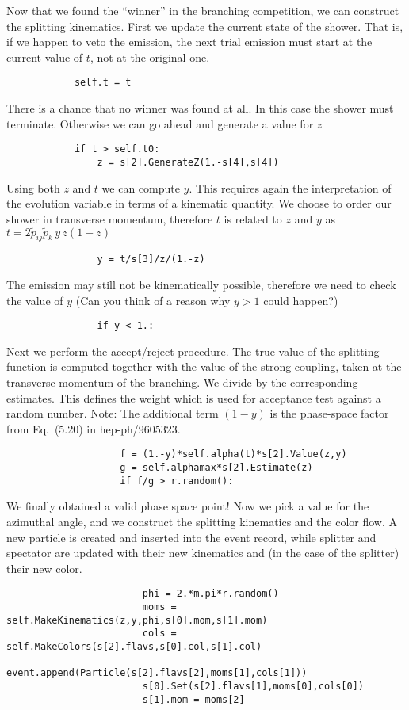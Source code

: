 \documentclass[10pt,fleqn]{scrartcl}
\begin{document}
Now that we found the ``winner'' in the branching competition, we can construct
the splitting kinematics. First we update the current state of the shower. That is,
if we happen to veto the emission, the next trial emission must start at the current
value of $t$, not at the original one.
\begin{verbatim}
            self.t = t
\end{verbatim}
There is a chance that no winner was found at all. In this case the shower must 
terminate. Otherwise we can go ahead and generate a value for $z$
\begin{verbatim}
            if t > self.t0:
                z = s[2].GenerateZ(1.-s[4],s[4])
\end{verbatim}
Using both $z$ and $t$ we can compute $y$. This requires again the interpretation of 
the evolution variable in terms of a kinematic quantity. We choose to order our shower
in transverse momentum, therefore $t$ is related to $z$ and $y$ as 
$t=2\tilde{p}_{ij}\tilde{p}_k\,y\,z(1-z)$
\begin{verbatim}
                y = t/s[3]/z/(1.-z)
\end{verbatim}
The emission may still not be kinematically possible, therefore we need to check 
the value of $y$ (Can you think of a reason why $y>1$ could happen?)
\begin{verbatim}
                if y < 1.:
\end{verbatim}
Next we perform the accept/reject procedure. The true value of the splitting function
is computed together with the value of the strong coupling, taken at the transverse 
momentum of the branching. We divide by the corresponding estimates. This defines
the weight which is used for acceptance test against a random number. Note: 
The additional term $(1-y)$ is the phase-space factor from Eq.~(5.20) in hep-ph/9605323.
\begin{verbatim}
                    f = (1.-y)*self.alpha(t)*s[2].Value(z,y)
                    g = self.alphamax*s[2].Estimate(z)
                    if f/g > r.random():
\end{verbatim}
We finally obtained a valid phase space point! Now we pick a value for the azimuthal angle,
and we construct the splitting kinematics and the color flow. A new particle is created and 
inserted into the event record, while splitter and spectator are updated with their 
new kinematics and (in the case of the splitter) their new color.
\begin{verbatim}
                        phi = 2.*m.pi*r.random()
                        moms = self.MakeKinematics(z,y,phi,s[0].mom,s[1].mom)
                        cols = self.MakeColors(s[2].flavs,s[0].col,s[1].col)
                        event.append(Particle(s[2].flavs[2],moms[1],cols[1]))
                        s[0].Set(s[2].flavs[1],moms[0],cols[0])
                        s[1].mom = moms[2]
\end{verbatim}
\end{document}

